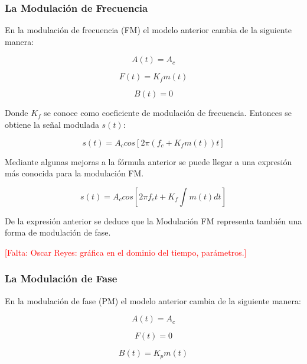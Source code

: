 \subsubsection{La Modulación de Frecuencia}
En la modulación de frecuencia (FM) el modelo anterior cambia de la siguiente manera:

\begin{equation} \label{equ_quince}
A(t)=A_c
\end{equation}

\begin{equation} \label{equ_dieciseis}
F(t)= K_f m(t)
\end{equation}

\begin{equation} \label{equ_diecisiete}
B(t)= 0
\end{equation}

Donde $K_f$ se conoce como coeficiente de modulación de frecuencia. Entonces se obtiene la señal modulada $s(t)$:

\begin{equation} \label{equ_diesiocho}
	s(t)=A_c cos[2 \pi (f_c+K_f m(t))t]
\end{equation}

Mediante algunas mejoras a la fórmula anterior se puede llegar a una expresión más conocida para la modulación FM.

\begin{equation} \label{equ_diesinueve}
s(t)=A_c cos[2 \pi f_c t + K_f \int m(t) dt]
\end{equation} 

De la expresión anterior se deduce que la Modulación FM representa también una forma de modulación de fase.

\textcolor{red}{[Falta: Oscar Reyes: gráfica en el dominio del tiempo, parámetros.]}


\subsubsection{La Modulación de Fase}
En la modulación de fase (PM) el modelo anterior cambia de la siguiente manera:

\begin{equation} \label{equ_veinte}
A(t)=A_c
\end{equation} 

\begin{equation} \label{equ_veintiuno}
F(t)= 0 
\end{equation} 

\begin{equation} \label{equ_veintidos}
B(t)= K_p m(t)
\end{equation} 

